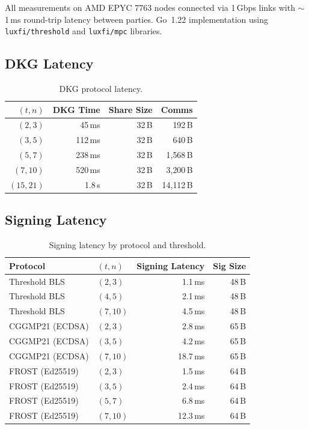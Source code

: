 \documentclass[11pt,a4paper]{article}
\begin{document}
All measurements on AMD EPYC 7763 nodes connected via 1\,Gbps links with
$\sim$1\,ms round-trip latency between parties. Go~1.22 implementation using
\texttt{luxfi/threshold} and \texttt{luxfi/mpc} libraries.

\subsection{DKG Latency}

\begin{table}[ht]
\centering
\caption{DKG protocol latency.}
\label{tab:dkg-benchmarks}
\begin{tabular}{rrrr}
\toprule
\textbf{$(t, n)$} & \textbf{DKG Time} & \textbf{Share Size} & \textbf{Comms} \\
\midrule
$(2, 3)$ & 45\,ms & 32\,B & 192\,B \\
$(3, 5)$ & 112\,ms & 32\,B & 640\,B \\
$(5, 7)$ & 238\,ms & 32\,B & 1{,}568\,B \\
$(7, 10)$ & 520\,ms & 32\,B & 3{,}200\,B \\
$(15, 21)$ & 1.8\,s & 32\,B & 14{,}112\,B \\
\bottomrule
\end{tabular}
\end{table}

\subsection{Signing Latency}

\begin{table}[ht]
\centering
\caption{Signing latency by protocol and threshold.}
\label{tab:signing-benchmarks}
\begin{tabular}{llrr}
\toprule
\textbf{Protocol} & \textbf{$(t, n)$} & \textbf{Signing Latency} & \textbf{Sig Size} \\
\midrule
Threshold BLS & $(2, 3)$ & 1.1\,ms & 48\,B \\
Threshold BLS & $(4, 5)$ & 2.1\,ms & 48\,B \\
Threshold BLS & $(7, 10)$ & 4.5\,ms & 48\,B \\
\midrule
CGGMP21 (ECDSA) & $(2, 3)$ & 2.8\,ms & 65\,B \\
CGGMP21 (ECDSA) & $(3, 5)$ & 4.2\,ms & 65\,B \\
CGGMP21 (ECDSA) & $(7, 10)$ & 18.7\,ms & 65\,B \\
\midrule
FROST (Ed25519) & $(2, 3)$ & 1.5\,ms & 64\,B \\
FROST (Ed25519) & $(3, 5)$ & 2.4\,ms & 64\,B \\
FROST (Ed25519) & $(5, 7)$ & 6.8\,ms & 64\,B \\
FROST (Ed25519) & $(7, 10)$ & 12.3\,ms & 64\,B \\
\bottomrule
\end{tabular}
\end{table}
\end{document}
